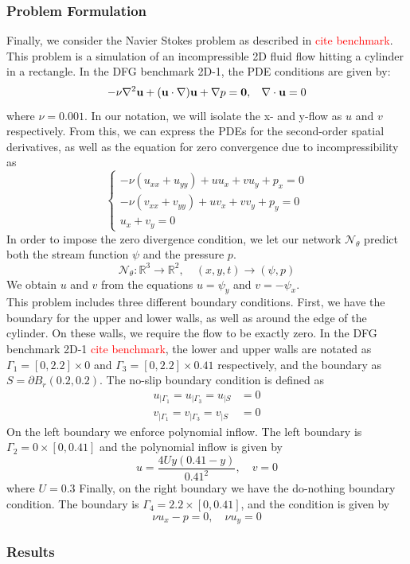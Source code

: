 \subsubsection{Problem Formulation}
Finally, we consider the Navier Stokes problem as described in \textcolor{red}{cite benchmark}. This problem is a simulation of an incompressible 2D fluid flow hitting a cylinder in a rectangle. In the DFG benchmark 2D-1, the PDE conditions are given by:
\begin{equation}
    -\nu \nabla^2 \mathbf{u} + (\mathbf{u} \cdot \nabla)\mathbf{u} + \nabla p = \mathbf{0}, \hspace{3mm} \nabla \cdot \mathbf{u} = 0
\end{equation}
where $\nu = 0.001$. In our notation, we will isolate the x- and y-flow as $u$ and $v$ respectively. From this, we can express the PDEs for the second-order spatial derivatives, as well as the equation for zero convergence due to incompressibility as
\begin{equation}
\begin{cases}
-\nu(u_{xx} + u_{yy})+uu_x+vu_y+p_x = 0 \\
-\nu(v_{xx} + v_{yy})+uv_x+vv_y+p_y = 0 \\
u_x + v_y = 0
\end{cases}
\end{equation}
In order to impose the zero divergence condition, we let our network $\mathcal{N}_\theta$ predict both the stream function $\psi$ and the pressure $p$.
\begin{equation}
    \mathcal{N}_\theta : \mathbb{R}^3 \to \mathbb{R}^2, \quad (x,y,t)\to (\psi, p)
\end{equation}
We obtain $u$ and $v$ from the equations $u=\psi_y$ and $v=-\psi_x$. \\
This problem includes three different boundary conditions. First, we have the boundary for the upper and lower walls, as well as around the edge of the cylinder. On these walls, we require the flow to be exactly zero. In the DFG benchmark 2D-1 \textcolor{red}{cite benchmark}, the lower and upper walls are notated as $\Gamma_1 = [0,2.2]\times 0$ and $\Gamma_3 = [0,2.2]\times 0.41$ respectively, and the boundary as $S=\partial B_r(0.2,0.2)$. The no-slip boundary condition is defined as
\begin{align*}
    u_{|\Gamma_1} = u_{|\Gamma_3} = u_{|S} &= 0 \\
    v_{|\Gamma_1} = v_{|\Gamma_3} = v_{|S} &= 0
\end{align*}
On the left boundary we enforce polynomial inflow. The left boundary is $\Gamma_2 = 0\times [0,0.41]$ and the polynomial inflow is given by
\begin{equation*}
    u=\frac{4Uy(0.41-y)}{0.41^2}, \quad v=0
\end{equation*}
where $U=0.3$
Finally, on the right boundary we have the do-nothing boundary condition. The boundary is $\Gamma_4=2.2\times[0,0.41]$, and the condition is given by
\begin{equation*}
    \nu u_x - p = 0, \quad \nu u_y = 0
\end{equation*}
\subsubsection{Results}